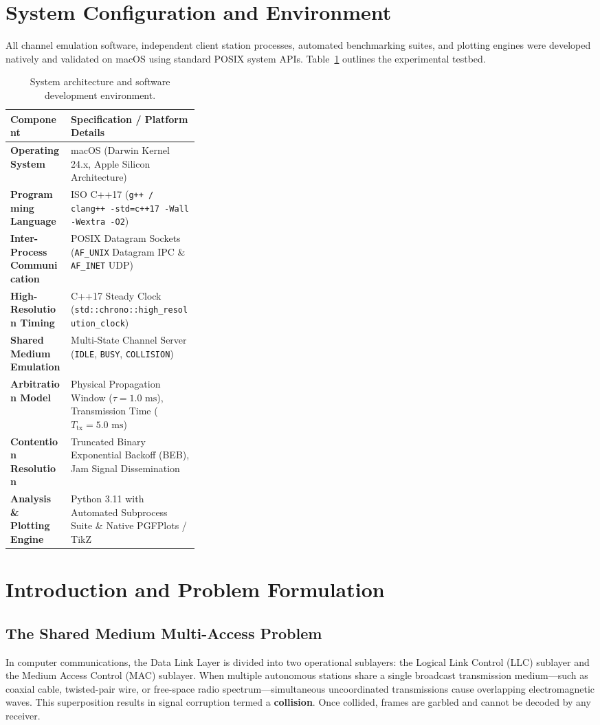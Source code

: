 \documentclass[11pt,a4paper]{article}
\begin{document}
\newpage

\section*{System Configuration and Environment}
All channel emulation software, independent client station processes, automated benchmarking suites, and plotting engines were developed natively and validated on macOS using standard POSIX system APIs. Table~\ref{tab:sysconfig} outlines the experimental testbed.

\begin{table}[H]
\centering
\small
\begin{tabularx}{\linewidth}{@{}>{\bfseries}p{0.32\linewidth} X@{}}
\toprule
Component & Specification / Platform Details \\
\midrule
Operating System & macOS (Darwin Kernel 24.x, Apple Silicon Architecture) \\
Programming Language & ISO C++17 (\texttt{g++ / clang++ -std=c++17 -Wall -Wextra -O2}) \\
Inter-Process Communication & POSIX Datagram Sockets (\texttt{AF\_UNIX} Datagram IPC \& \texttt{AF\_INET} UDP) \\
High-Resolution Timing & C++17 Steady Clock (\texttt{std::chrono::high\_resolution\_clock}) \\
Shared Medium Emulation & Multi-State Channel Server (\texttt{IDLE}, \texttt{BUSY}, \texttt{COLLISION}) \\
Arbitration Model & Physical Propagation Window ($\tau = 1.0\text{ ms}$), Transmission Time ($T_{\text{tx}} = 5.0\text{ ms}$) \\
Contention Resolution & Truncated Binary Exponential Backoff (BEB), Jam Signal Dissemination \\
Analysis \& Plotting Engine & Python 3.11 with Automated Subprocess Suite \& Native PGFPlots / TikZ \\
\bottomrule
\end{tabularx}
\caption{System architecture and software development environment.}
\label{tab:sysconfig}
\end{table}

\section{Introduction and Problem Formulation}

\subsection{The Shared Medium Multi-Access Problem}
In computer communications, the Data Link Layer is divided into two operational sublayers: the Logical Link Control (LLC) sublayer and the Medium Access Control (MAC) sublayer. When multiple autonomous stations share a single broadcast transmission medium—such as coaxial cable, twisted-pair wire, or free-space radio spectrum—simultaneous uncoordinated transmissions cause overlapping electromagnetic waves. This superposition results in signal corruption termed a \textbf{collision}. Once collided, frames are garbled and cannot be decoded by any receiver.
\end{document}
